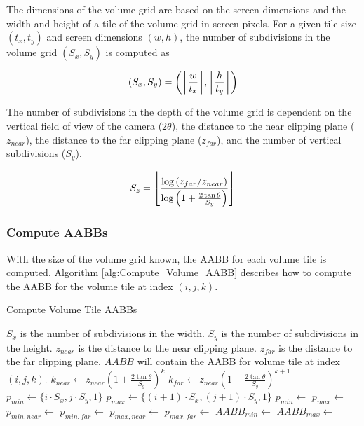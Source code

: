 The dimensions of the volume grid are based on the screen dimensions and the width and height of a tile of the volume grid in screen pixels. For a given tile size $(t_x, t_y)$ and screen dimensions $(w,h)$, the number of subdivisions in the volume grid $(S_x,S_y)$ is computed as

\begin{equation}
(S_x,S_y)=\left(\ceil*{\frac{w}{t_x}},\ceil*{\frac{h}{t_y}}\right)
\label{eqn:VolumeGridSubdivisionXY}
\end{equation}

The number of subdivisions in the depth of the volume grid is dependent on the vertical field of view of the camera ($2\theta$), the distance to the near clipping plane ($z_{near}$), the distance to the far clipping plane ($z_{far}$), and the number of vertical subdivisions ($S_y$).

\begin{equation}
S_z=\floor*{\frac{\log\left(z_{far}/z_{near}\right)}{\log\left(1+\frac{2\tan{\theta}}{S_y}\right)}}
\label{eqn:VolumeGridSubdivisionZ}
\end{equation}

\subsubsection{Compute AABBs}

With the size of the volume grid known, the AABB for each volume tile is computed. Algorithm \ref{alg:Compute_Volume_AABB} describes how to compute the AABB for the volume tile at index $(i, j, k)$.

\begin{algorithm}[h]
\caption{Compute Volume Tile AABBs}
\label{alg:Compute_Volume_AABB}
\begin{algorithmic}[1]
\Require $S_x$ is the number of subdivisions in the width.
\Require $S_y$ is the number of subdivisions in the height.
\Require $z_{near}$ is the distance to the near clipping plane.
\Require $z_{far}$ is the distance to the far clipping plane.
\Ensure $AABB$ will contain the AABB for  volume tile at index $(i,j,k)$.
\State $k_{near} \gets z_{near} \left( 1 + \frac{ 2\tan{\theta}}{S_y} \right)^k$
\State $k_{far} \gets z_{near} \left( 1 + \frac{ 2\tan{\theta}}{S_y} \right)^{k+1}$
\State $p_{min} \gets \{ i \cdot S_x, j \cdot S_y, 1 \}$
\State $p_{max} \gets \{ (i+1) \cdot S_x, (j+1) \cdot S_y, 1 \}$
\State $p_{min} \gets$ 
\State $p_{max} \gets$ 
\State $p_{min,near} \gets$ 
\State $p_{min,far} \gets$ 
\State $p_{max,near} \gets$ 
\State $p_{max,far} \gets$ 
\State $AABB_{min} \gets$ 
\State $AABB_{max} \gets$ 
\EndFunction
\end{algorithmic}
\end{algorithm}

